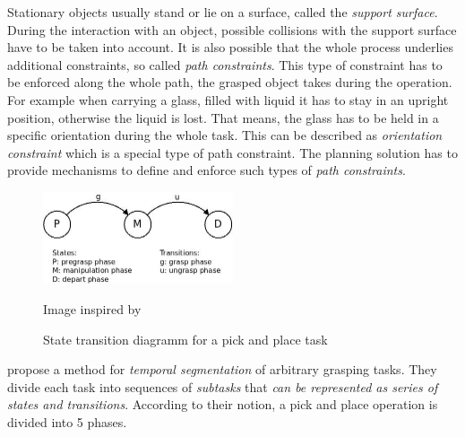 Stationary objects usually stand or lie on a surface, called the \emph{support surface}. During the interaction with an object, possible collisions with the support surface have to be taken into account. It is also possible that the whole process underlies additional constraints, so called \emph{path constraints}. This type of constraint has to be enforced along the whole path, the grasped object takes during the operation. For example when carrying a glass, filled with liquid it has to stay in an upright position, otherwise the liquid is lost. That means, the glass has to be held in a specific orientation during the whole task. This can be described as \emph{orientation constraint} which is a special type of path constraint. The planning solution has to provide mechanisms to define and enforce such types of \emph{path constraints}. \\

\begin{figure}[ht]
	\centering
  	\includegraphics[width=0.5\textwidth]{images/state_trans.jpg}
	\caption{State transition diagramm for a pick and place task}
	{\scriptsize Image inspired by \citep{kang1994}}
	\label{fig:state_trans}
\end{figure}

\citep{kang1994} propose a method for \emph{temporal segmentation} of arbitrary grasping tasks. They divide each task into sequences of \emph{subtasks} that \emph{can be represented as series of states and transitions}. According to their notion, a pick and place operation is divided into 5 phases.

